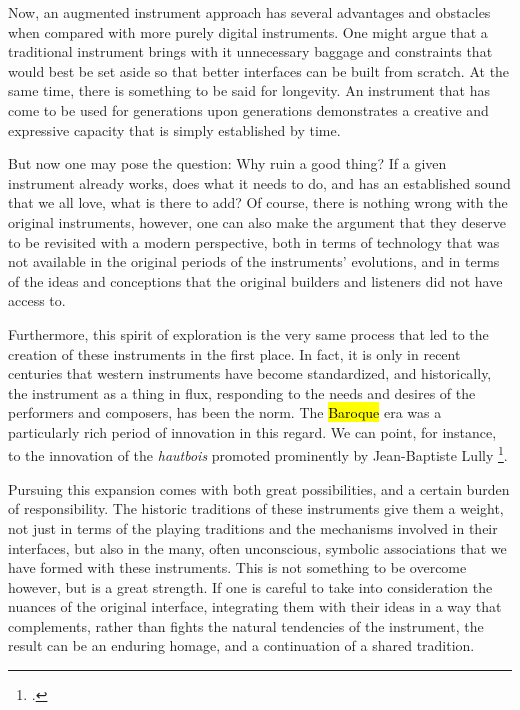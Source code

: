 \documentclass[12pt,twoside,maitrise]{dms_ks}
\theoremstyle{definition}
\begin{document}

Now, an augmented instrument approach has several advantages and obstacles when compared with more purely digital instruments. 
One might argue that a traditional instrument brings with it unnecessary baggage and constraints that would best be set aside so that better interfaces can be built from scratch.  
At the same time, there is something to be said for longevity.
An instrument that has come to be used for generations upon generations demonstrates a creative and expressive capacity that is simply established by time.

But now one may pose the question: Why ruin a good thing?
If a given instrument already works, does what it needs to do, and has an established sound that we all love, what is there to add?
Of course, there is nothing wrong with the original instruments, however, one can also make the argument that they deserve to be revisited with a modern perspective, both in terms of technology that was not available in the original periods of the instruments' evolutions, and in terms of the ideas and conceptions that the original builders and listeners did not have access to. 

Furthermore, this spirit of exploration is the very same process that led to the creation of these instruments in the first place.
In fact, it is only in recent centuries that western instruments have become standardized, and historically, the instrument as a thing in flux, responding to the needs and desires of the performers and composers, has been the norm.
The \hl{Baroque} era was a particularly rich period of innovation in this regard.
We can point, for instance, to the innovation of the \textit{hautbois} promoted prominently by Jean-Baptiste Lully \footcite{wainwright_renaissance_2017}.


Pursuing this expansion comes with both great possibilities, and a certain burden of responsibility.
The historic traditions of these instruments give them a weight, not just in terms of the playing traditions and the mechanisms involved in their interfaces, but also in the many, often unconscious, symbolic associations that we have formed with these instruments.
This is not something to be overcome however, but is a great strength.
If one is careful to take into consideration the nuances of the original interface, integrating them with their ideas in a way that complements, rather than fights the natural tendencies of the instrument, the result can be an enduring homage, and a continuation of a shared tradition.
\end{document}
